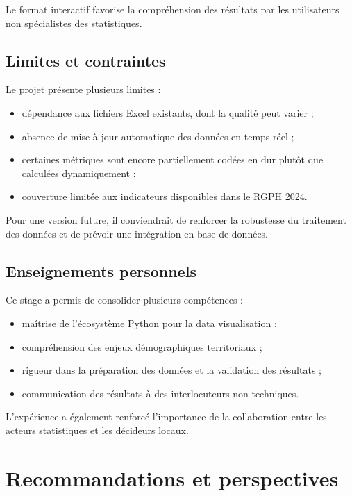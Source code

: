 \documentclass[12pt,a4paper,oneside]{report}
\begin{document}
Le format interactif favorise la compréhension des résultats par les utilisateurs non spécialistes des statistiques.

\section{Limites et contraintes}

Le projet présente plusieurs limites :

\begin{itemize}[leftmargin=*]
  \item dépendance aux fichiers Excel existants, dont la qualité peut varier ;
  \item absence de mise à jour automatique des données en temps réel ;
  \item certaines métriques sont encore partiellement codées en dur plutôt que calculées dynamiquement ;
  \item couverture limitée aux indicateurs disponibles dans le RGPH 2024.
\end{itemize}

Pour une version future, il conviendrait de renforcer la robustesse du traitement des données et de prévoir une intégration en base de données.

\section{Enseignements personnels}

Ce stage a permis de consolider plusieurs compétences :

\begin{itemize}[leftmargin=*]
  \item maîtrise de l'écosystème Python pour la data visualisation ;
  \item compréhension des enjeux démographiques territoriaux ;
  \item rigueur dans la préparation des données et la validation des résultats ;
  \item communication des résultats à des interlocuteurs non techniques.
\end{itemize}

L'expérience a également renforcé l'importance de la collaboration entre les acteurs statistiques et les décideurs locaux.

\chapter{Recommandations et perspectives}
\end{document}
